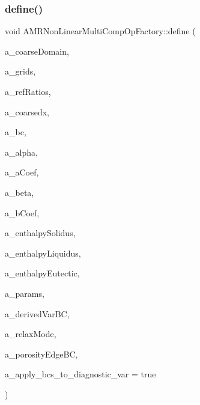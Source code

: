 \subsubsection{\texorpdfstring{define()}{define()}}
{\footnotesize\ttfamily void A\+M\+R\+Non\+Linear\+Multi\+Comp\+Op\+Factory\+::define (\begin{DoxyParamCaption}\item[{const \textbf{ Problem\+Domain} \&}]{a\+\_\+coarse\+Domain,  }\item[{const \textbf{ Vector}$<$ \textbf{ Disjoint\+Box\+Layout} $>$ \&}]{a\+\_\+grids,  }\item[{const \textbf{ Vector}$<$ int $>$ \&}]{a\+\_\+ref\+Ratios,  }\item[{const \textbf{ Real} \&}]{a\+\_\+coarsedx,  }\item[{\textbf{ B\+C\+Holder}}]{a\+\_\+bc,  }\item[{const \textbf{ Real} \&}]{a\+\_\+alpha,  }\item[{\textbf{ Vector}$<$ \textbf{ Ref\+Counted\+Ptr}$<$ \textbf{ Level\+Data}$<$ \textbf{ F\+Array\+Box} $>$ $>$ $>$ \&}]{a\+\_\+a\+Coef,  }\item[{const \textbf{ Real} \&}]{a\+\_\+beta,  }\item[{\textbf{ Vector}$<$ \textbf{ Ref\+Counted\+Ptr}$<$ \textbf{ Level\+Data}$<$ \textbf{ Flux\+Box} $>$ $>$ $>$ \&}]{a\+\_\+b\+Coef,  }\item[{\textbf{ Vector}$<$ \textbf{ Ref\+Counted\+Ptr}$<$ \textbf{ Level\+Data}$<$ \textbf{ F\+Array\+Box} $>$ $>$ $>$ \&}]{a\+\_\+enthalpy\+Solidus,  }\item[{\textbf{ Vector}$<$ \textbf{ Ref\+Counted\+Ptr}$<$ \textbf{ Level\+Data}$<$ \textbf{ F\+Array\+Box} $>$ $>$ $>$ \&}]{a\+\_\+enthalpy\+Liquidus,  }\item[{\textbf{ Vector}$<$ \textbf{ Ref\+Counted\+Ptr}$<$ \textbf{ Level\+Data}$<$ \textbf{ F\+Array\+Box} $>$ $>$ $>$ \&}]{a\+\_\+enthalpy\+Eutectic,  }\item[{\hyperlink{class_mushy_layer_params}{Mushy\+Layer\+Params} $\ast$}]{a\+\_\+params,  }\item[{\textbf{ B\+C\+Holder}}]{a\+\_\+derived\+Var\+BC,  }\item[{int}]{a\+\_\+relax\+Mode,  }\item[{\hyperlink{class_edge_vel_b_c_holder}{Edge\+Vel\+B\+C\+Holder}}]{a\+\_\+porosity\+Edge\+BC,  }\item[{bool}]{a\+\_\+apply\+\_\+bcs\+\_\+to\+\_\+diagnostic\+\_\+var = {\ttfamily true} }\end{DoxyParamCaption})}



